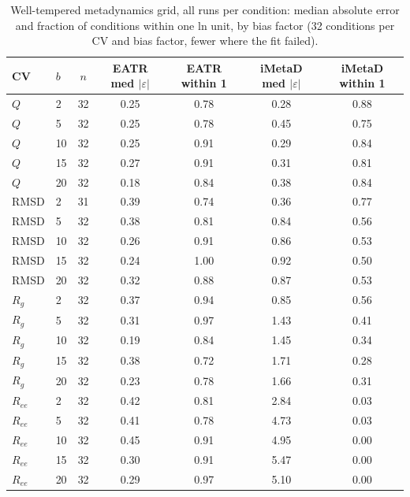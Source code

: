 \begin{table}[H]\centering
\caption{Well-tempered metadynamics grid, all runs per condition: median absolute error and fraction of conditions within one ln unit, by bias factor (32 conditions per CV and bias factor, fewer where the fit failed).}\label{tab:s1}
\begin{tabular}{llccccc}\toprule
CV & $b$ & $n$ & EATR med $|\varepsilon|$ & EATR within 1 & iMetaD med $|\varepsilon|$ & iMetaD within 1\\ \midrule
$Q$ & 2 & 32 & 0.25 & 0.78 & 0.28 & 0.88 \\
$Q$ & 5 & 32 & 0.25 & 0.78 & 0.45 & 0.75 \\
$Q$ & 10 & 32 & 0.25 & 0.91 & 0.29 & 0.84 \\
$Q$ & 15 & 32 & 0.27 & 0.91 & 0.31 & 0.81 \\
$Q$ & 20 & 32 & 0.18 & 0.84 & 0.38 & 0.84 \\
RMSD & 2 & 31 & 0.39 & 0.74 & 0.36 & 0.77 \\
RMSD & 5 & 32 & 0.38 & 0.81 & 0.84 & 0.56 \\
RMSD & 10 & 32 & 0.26 & 0.91 & 0.86 & 0.53 \\
RMSD & 15 & 32 & 0.24 & 1.00 & 0.92 & 0.50 \\
RMSD & 20 & 32 & 0.32 & 0.88 & 0.87 & 0.53 \\
$R_g$ & 2 & 32 & 0.37 & 0.94 & 0.85 & 0.56 \\
$R_g$ & 5 & 32 & 0.31 & 0.97 & 1.43 & 0.41 \\
$R_g$ & 10 & 32 & 0.19 & 0.84 & 1.45 & 0.34 \\
$R_g$ & 15 & 32 & 0.38 & 0.72 & 1.71 & 0.28 \\
$R_g$ & 20 & 32 & 0.23 & 0.78 & 1.66 & 0.31 \\
$R_{ee}$ & 2 & 32 & 0.42 & 0.81 & 2.84 & 0.03 \\
$R_{ee}$ & 5 & 32 & 0.41 & 0.78 & 4.73 & 0.03 \\
$R_{ee}$ & 10 & 32 & 0.45 & 0.91 & 4.95 & 0.00 \\
$R_{ee}$ & 15 & 32 & 0.30 & 0.91 & 5.47 & 0.00 \\
$R_{ee}$ & 20 & 32 & 0.29 & 0.97 & 5.10 & 0.00\\ \bottomrule
\end{tabular}
\end{table}
